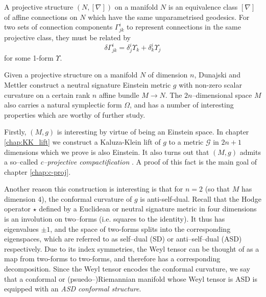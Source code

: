 \begin{defi} A projective structure $(N,[\nabla])$
on a manifold $N$ is an equivalence class $[\nabla]$ of affine connections
on $N$ which have the same unparametrised geodesics. For two sets
of connection components $\Gamma_{jk}^{i}$ to represent connections
in the same projective class, they must be related by
\begin{equation}
\delta\Gamma_{jk}^{i}=\delta_{j}^{i}\Upsilon_{k}+\delta_{k}^{i}\Upsilon_{j}\label{eq:proj_change}
\end{equation}
for some 1-form $\Upsilon.$
\end{defi}

Given a projective structure on a manifold $N$ of dimension $n$,
Dunajski and Mettler \cite{DM} construct a neutral signature Einstein metric $g$ with non-zero
scalar curvature on a certain rank $n$ affine bundle $M\rightarrow N$.
The $2n$--dimensional space $M$ also carries a natural symplectic form $\Omega$, and
has a number of interesting properties which are worthy of further
study.

Firstly, $(M,g)$ is interesting by virtue of being an Einstein
space. In chapter \ref{chap:KK_lift} we construct a Kaluza-Klein lift of $g$ to a metric $\mathcal{G}$ in $2n+1$ dimensions which we prove is also Einstein. It also turns out that $(M,g)$ admits a so--called \textit{c--projective compactification} \cite{CG}. A proof of this fact is the main goal of chapter \ref{chap:c-proj}.

Another reason this construction is interesting is that for $n=2$ (so that $M$ has dimension $4$), the conformal
curvature of $g$ is anti-self-dual. Recall that the Hodge operator
$\star$ defined by a Euclidean or neutral signature metric in four
dimensions is an involution on two--forms (i.e. squares to the identity).
It thus has eigenvalues $\pm1$, and the space of two-forms splits
into the corresponding eigenspaces, which are referred to as self--dual
(SD) or anti--self--dual (ASD) respectively. Due to its index symmetries,
the Weyl tensor can be thought of as a map from two-forms to two-forms,
and therefore has a corresponding decomposition. Since the Weyl tensor
encodes the conformal curvature, we say that a conformal or (psuedo--)Riemannian
manifold whose Weyl tensor is ASD is equipped with an \textit{ASD
conformal structure}.


